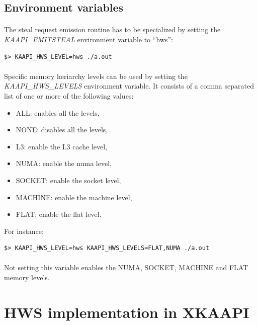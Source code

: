 \documentclass[a4paper, 11pt]{article}
\begin{document}
\subsection{Environment variables}
\paragraph{}
The steal request emission routine has to be specialized by setting the
\textit{KAAPI\_EMITSTEAL} environment variable to ``hws'':\\
\begin{small}
\begin{lstlisting}[frame=tb]
$> KAAPI_HWS_LEVEL=hws ./a.out
\end{lstlisting}
\end{small}

\paragraph{}
Specific memory heriarchy levels can be used by setting the
\textit{KAAPI\_HWS\_LEVELS} environment variable. It consists of a comma
separated list of one or more of the following values:
\begin{itemize}
  \item ALL: enables all the levels,
  \item NONE: disables all the levels,
  \item L3: enable the L3 cache level,
  \item NUMA: enable the numa level,
  \item SOCKET: enable the socket level,
  \item MACHINE: enable the machine level,
  \item FLAT: enable the flat level.
\end{itemize}
For instance:\\
\begin{small}
\begin{lstlisting}[frame=tb]
$> KAAPI_HWS_LEVEL=hws KAAPI_HWS_LEVELS=FLAT,NUMA ./a.out
\end{lstlisting}
\end{small}

\paragraph{}
Not setting this variable enables the NUMA, SOCKET, MACHINE and FLAT
memory levels.

%
\newpage
\section{HWS implementation in XKAAPI}
\end{document}
